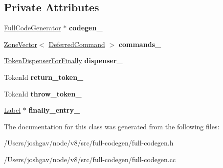 \subsection*{Private Attributes}
\begin{DoxyCompactItemize}
\item 
\hyperlink{classv8_1_1internal_1_1_full_code_generator}{Full\+Code\+Generator} $\ast$ {\bfseries codegen\+\_\+}\hypertarget{classv8_1_1internal_1_1_full_code_generator_1_1_deferred_commands_a29b70efd3a876c2358ed53c014cc1d67}{}\label{classv8_1_1internal_1_1_full_code_generator_1_1_deferred_commands_a29b70efd3a876c2358ed53c014cc1d67}

\item 
\hyperlink{classv8_1_1internal_1_1_zone_vector}{Zone\+Vector}$<$ \hyperlink{structv8_1_1internal_1_1_full_code_generator_1_1_deferred_commands_1_1_deferred_command}{Deferred\+Command} $>$ {\bfseries commands\+\_\+}\hypertarget{classv8_1_1internal_1_1_full_code_generator_1_1_deferred_commands_ae65c1c18eddae7323057e267ba517a33}{}\label{classv8_1_1internal_1_1_full_code_generator_1_1_deferred_commands_ae65c1c18eddae7323057e267ba517a33}

\item 
\hyperlink{classv8_1_1internal_1_1_token_dispenser_for_finally}{Token\+Dispenser\+For\+Finally} {\bfseries dispenser\+\_\+}\hypertarget{classv8_1_1internal_1_1_full_code_generator_1_1_deferred_commands_a9af872c6721f5f33dbfcfb4b000d2517}{}\label{classv8_1_1internal_1_1_full_code_generator_1_1_deferred_commands_a9af872c6721f5f33dbfcfb4b000d2517}

\item 
Token\+Id {\bfseries return\+\_\+token\+\_\+}\hypertarget{classv8_1_1internal_1_1_full_code_generator_1_1_deferred_commands_a6a9b5a76e8559729dfa777f05d3d3843}{}\label{classv8_1_1internal_1_1_full_code_generator_1_1_deferred_commands_a6a9b5a76e8559729dfa777f05d3d3843}

\item 
Token\+Id {\bfseries throw\+\_\+token\+\_\+}\hypertarget{classv8_1_1internal_1_1_full_code_generator_1_1_deferred_commands_a9ae135cfa0a5a3aa2e274170fb2aca15}{}\label{classv8_1_1internal_1_1_full_code_generator_1_1_deferred_commands_a9ae135cfa0a5a3aa2e274170fb2aca15}

\item 
\hyperlink{classv8_1_1internal_1_1_label}{Label} $\ast$ {\bfseries finally\+\_\+entry\+\_\+}\hypertarget{classv8_1_1internal_1_1_full_code_generator_1_1_deferred_commands_ad31dcb2d534e585541adbcf8ca952166}{}\label{classv8_1_1internal_1_1_full_code_generator_1_1_deferred_commands_ad31dcb2d534e585541adbcf8ca952166}

\end{DoxyCompactItemize}


The documentation for this class was generated from the following files\+:\begin{DoxyCompactItemize}
\item 
/\+Users/joshgav/node/v8/src/full-\/codegen/full-\/codegen.\+h\item 
/\+Users/joshgav/node/v8/src/full-\/codegen/full-\/codegen.\+cc\end{DoxyCompactItemize}
